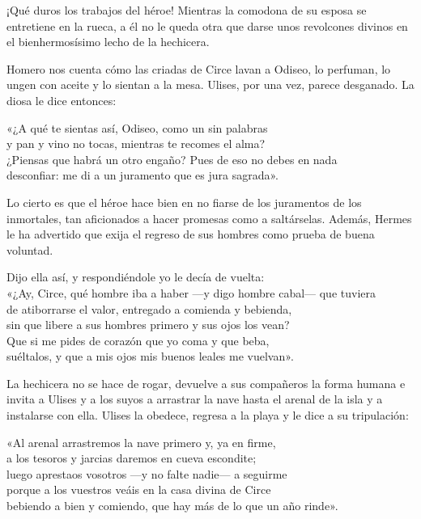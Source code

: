 ¡Qué duros los trabajos del héroe! Mientras la comodona de su esposa se entretiene en la rueca, a él no le queda otra que darse unos revolcones divinos en el bienhermosísimo lecho de la hechicera.

Homero nos cuenta cómo las criadas de Circe lavan a Odiseo, lo perfuman, lo ungen con aceite y lo sientan a la mesa. Ulises, por una vez, parece desganado. La diosa le dice entonces:

\begin{versocita}
«¿A qué te sientas así, Odiseo, como un sin palabras\\
y pan y vino no tocas, mientras te recomes el alma?\\
¿Piensas que habrá un otro engaño? Pues de eso no debes en nada\\
desconfiar: me di a un juramento que es jura sagrada».
\end{versocita}

Lo cierto es que el héroe hace bien en no fiarse de los juramentos de los inmortales, tan aficionados a hacer promesas como a saltárselas. Además, Hermes le ha advertido que exija el regreso de sus hombres como prueba de buena voluntad.

\begin{versocita}
Dijo ella así, y respondiéndole yo le decía de vuelta:\\
«¿Ay, Circe, qué hombre iba a haber ---y digo hombre cabal--- que tuviera\\
de atiborrarse el valor, entregado a comienda y bebienda,\\
sin que libere a sus hombres primero y sus ojos los vean?\\
Que si me pides de corazón que yo coma y que beba,\\
suéltalos, y que a mis ojos mis buenos leales me vuelvan».
\end{versocita}

La hechicera no se hace de rogar, devuelve a sus compañeros la forma humana e invita a Ulises y a los suyos a arrastrar la nave hasta el arenal de la isla y a instalarse con ella. Ulises la obedece, regresa a la playa y le dice a su tripulación:

\begin{versocita}
«Al arenal arrastremos la nave primero y, ya en firme,\\
a los tesoros y jarcias daremos en cueva escondite;\\
luego aprestaos vosotros ---y no falte nadie--- a seguirme\\
porque a los vuestros veáis en la casa divina de Circe\\
bebiendo a bien y comiendo, que hay más de lo que un año rinde».
\end{versocita}

